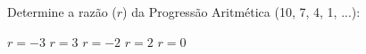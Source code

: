 Determine a razão ($r$) da Progressão Aritmética (10, 7, 4, 1, ...):

$r=-3$
$r=3$
$r=-2$
$r=2$
$r=0$




